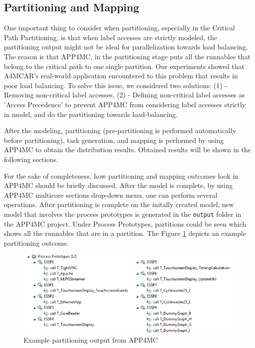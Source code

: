 \subsection{Partitioning and Mapping}

One important thing to consider when partitioning, especially in the Critical Path Partitioning, is that when label accesses are strictly modeled, the partitioning output might not be ideal for parallelization towards load balancing. The reason is that APP4MC, in the partitioning stage puts all the runnables that belong to the critical path to one single partition. Our experiments showed that A4MCAR's real-world application encountered to this problem that results in poor load balancing. To solve this issue, we considered two solutions: (1) - Removing non-critical label accesses, (2) - Defining non-critical label accesses as 'Access Precedence' to prevent APP4MC from considering label accesses strictly in model, and do the partitioning towards load-balancing.

After the modeling, partitioning (pre-partitioning is performed automatically before partitioning), task generation, and mapping is performed by using APP4MC to obtain the distribution results. Obtained results will be shown in the following sections.

For the sake of completeness, how partitioning and mapping outcomes look in APP4MC should be briefly discussed. After the model is complete, by using APP4MC multicore sections drop-down menu, one can perform several operations. After partitioning is complete on the initally created model, new model that involves the process prototypes is generated in the \texttt{output} folder in the APP4MC project. Under Process Prototypes, partitions could be seen which shows all the runnables that are in a partition. The Figure \ref{fig:partitions} depicts an example partitioning outcome.

\begin{figure}[!ht]
	\centering
	\includegraphics[width=\textwidth]{content/images/partitions.png}
	\caption{Example partitioning output from APP4MC}
	\label{fig:partitions}
\end{figure}

